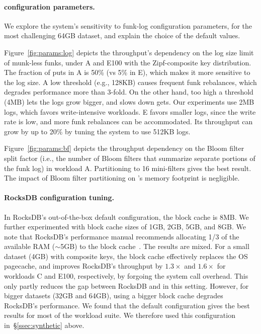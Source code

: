 \paragraph{\sys\/ configuration parameters.} 
We explore the system's  sensitivity to funk-log configuration parameters, for the most challenging 64GB dataset, 
and explain the choice of the default values.

Figure~\ref{fig:params:log} depicts the throughput's dependency on the log size limit of munk-less funks, 
under  A and E100  with the Zipf-composite key distribution. 
The fraction of puts in A is 50\% (vs 5\% in E), which makes it more sensitive to the log size. 
A low threshold (e.g., 128KB) causes frequent funk rebalances, which degrades performance more than 3-fold. 
On the other hand, too high a threshold (4MB) lets the logs grow bigger, and slows down gets. Our experiments  
use 2MB logs, which favors write-intensive workloads. E favors smaller logs, since the write 
rate is low, and more funk rebalances can be accommodated. Its throughput can  grow by up to 20\% 
by tuning the system to use 512KB logs.

Figure~\ref{fig:params:bf} depicts the throughput dependency on the Bloom filter split factor (i.e., the 
number of Bloom filters that summarize separate portions of the funk log) in workload A. 
Partitioning to 16 mini-filters gives the best result. %
The impact of Bloom filter partitioning on \sys's %
memory footprint is negligible.

\paragraph{RocksDB configuration tuning.} In RocksDB's out-of-the-box default configuration, the block cache is 8MB. 
We further experimented with block cache sizes of 1GB, 2GB, 5GB, and 8GB. We note that 
RocksDB's performance manual recommends allocating 1/3 of the available RAM 
($\sim$5GB) to the block cache~\cite{RocksDBMemoryTuning}.
The results are mixed. For a small 
dataset (4GB) with composite keys, the block cache effectively replaces 
the OS pagecache, and improves RocksDB's throughput by $1.3\times$ and $1.6\times$
for workloads C and E100, respectively, by forgoing the system call overhead. This only partly reduces the gap between
RocksDB and \sys\/ in this setting. 
However, for  bigger datasets (32GB and 64GB),   using a  bigger block cache degrades  RocksDB's performance. 
We found that the default configuration gives the best results for most of the workload suite. 
We therefore used this configuration  in~\S\ref{ssec:synthetic} above.   





